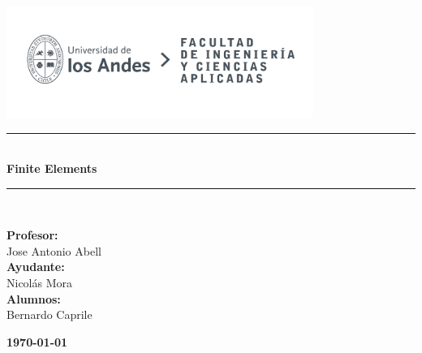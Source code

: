 \documentclass{article}  %
\begin{document}
\begin{titlepage}%
\newcommand{\HRule}{\rule{\linewidth}{0.5mm}} 
\center 
\includegraphics[width=10cm]{LOGO_UNIVERSIDAD.jpg}\\ %
\vspace{3cm}
\HRule \\[0.4cm]
{ \huge \bfseries Finite Elements}\\[0.4cm] %
\HRule \\[1.5cm]
 \vspace{5cm}
\begin{flushright}
  { \textbf{Profesor:}\\
  Jose Antonio Abell\\
  \textbf{Ayudante:}\\
  Nicolás Mora\\
  \textbf{Alumnos:} \\
  Bernardo Caprile\\
}
\end{flushright}
\vspace{1cm}
{\large \textbf{\today}}\\[2cm] %
\end{titlepage}
\end{document}
